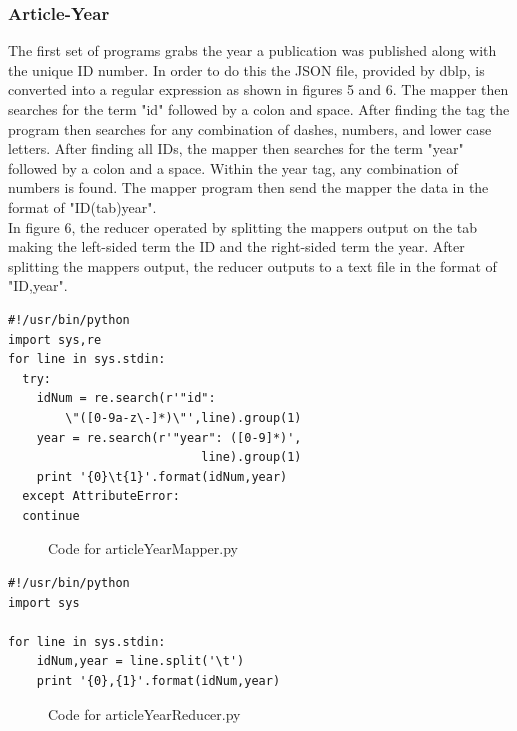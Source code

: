 \documentclass[10pt,journal,compsoc]{IEEEtran}
\begin{document}
\subsubsection{Article-Year}
\indent The first set of programs grabs the year a publication was published along with the unique ID number. In order to do this the JSON file, provided by dblp, is converted into a regular expression as shown in figures 5 and 6. The mapper then searches for the term "id" followed by a colon and space. After finding the tag the program then searches for any combination of dashes, numbers, and lower case letters. After finding all IDs, the mapper then searches for the term "year" followed by a colon and a space. Within the year tag, any combination of numbers is found. The mapper program then send the mapper the data in the format of "ID(tab)year".\\
\indent In figure 6, the reducer operated by splitting the mappers output on the tab making the left-sided term the ID and the right-sided term the year. After splitting the mappers output, the reducer outputs to a text file in the format of "ID,year".

\begin{verbatim}
#!/usr/bin/python
import sys,re
for line in sys.stdin:
  try:
    idNum = re.search(r'"id": 
        \"([0-9a-z\-]*)\"',line).group(1)
    year = re.search(r'"year": ([0-9]*)',
                           line).group(1)
    print '{0}\t{1}'.format(idNum,year)
  except AttributeError:
  continue
\end{verbatim}
\begin{figure}[htp]
\centering
\caption{Code for articleYearMapper.py}
\label{fig: articleYearMapper.py}
\end{figure}

\begin{verbatim}
#!/usr/bin/python
import sys

for line in sys.stdin:
    idNum,year = line.split('\t')
    print '{0},{1}'.format(idNum,year)
\end{verbatim}
\begin{figure}[htp]
\centering
\caption{Code for articleYearReducer.py}
\label{fig: articleYearReducer.py}
\end{figure}
\end{document}
